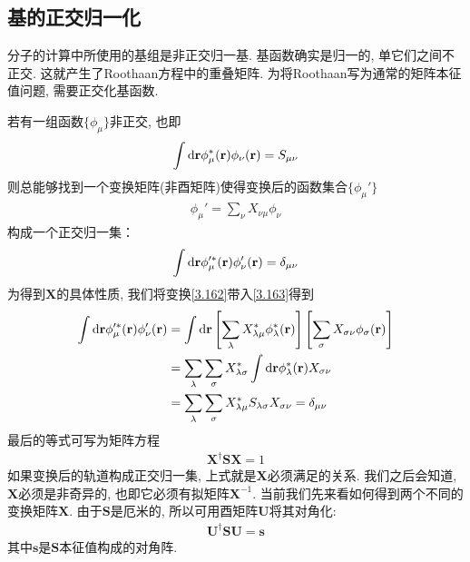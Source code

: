 \subsection{基的正交归一化}
分子的计算中所使用的基组是非正交归一基. 
基函数确实是归一的, 
单它们之间不正交. 
这就产生了Roothaan方程中的重叠矩阵. 
为将Roothaan写为通常的矩阵本征值问题, 
需要正交化基函数.


若有一组函数$\{\phi_\mu\}$非正交, 
也即
\begin{align}
	\int\dd{r}\phi_\mu^*(\bfr)\phi_\nu(\bfr) = S_{\mu\nu}
\end{align}
则总能够找到一个变换矩阵(非酉矩阵)使得变换后的函数集合$\{\phi_\mu'\}$
\begin{align}\label{3.162}
	\phi_\mu' = \sum_{\nu}X_{\nu\mu}\phi_\nu
\end{align}
构成一个正交归一集：
\begin{align}
	\label{3.163}
	\int\dd{r}\phi_\mu^{\prime*}(\bfr)\phi_\nu'(\bfr) = \delta_{\mu\nu}
\end{align}
为得到$\mathbf{X}$的具体性质, 
我们将变换\eqref{3.162}带入\eqref{3.163}得到
\begin{align}
	\int\dd{r}\phi_\mu^{\prime *}(\bfr)\phi_\nu^{\prime}(\bfr) & = \int\dd{r}\left[ \sum_{\lambda}X_{\lambda\mu}^*\phi_{\lambda}^*(\bfr)\right]\left[ \sum_\sigma X_{\sigma\nu}\phi_\sigma(\bfr) \right]\notag\\
	& = \sum_\lambda\sum_\sigma X_{\lambda\sigma}^*\int\dd{r}\phi_\lambda^*(\bfr)X_{\sigma\nu}\notag\\
	& = \sum_\lambda\sum_\sigma X_{\lambda\mu}^*S_{\lambda\sigma}X_{\sigma\nu} = \delta_{\mu\nu}
\end{align}
最后的等式可写为矩阵方程
\begin{align}\label{3.165}
	\mathbf{X^\dagger SX}=1
\end{align}
如果变换后的轨道构成正交归一集, 
上式就是$\mathbf{X}$必须满足的关系. 
我们之后会知道, 
$\mathbf{X}$必须是非奇异的, 
也即它必须有拟矩阵$\mathbf{X}^{-1}$. 
当前我们先来看如何得到两个不同的变换矩阵$\mathbf{X}$. 
由于$\mathbf{S}$是厄米的, 
所以可用酉矩阵$\mathbf{U}$将其对角化:
\begin{align}
	\mathbf{U^\dagger SU=s}
\end{align} 
其中$\mathbf{s}$是$\mathbf{S}$本征值构成的对角阵.



